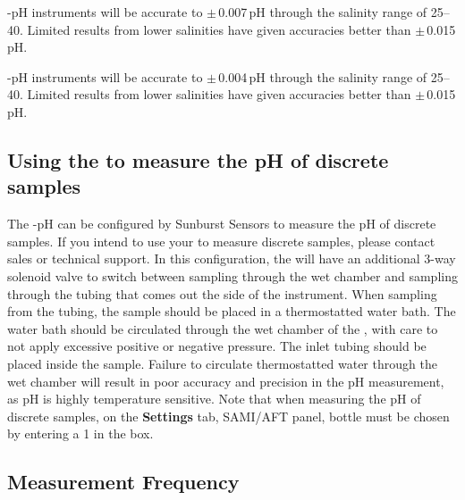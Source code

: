 \ifcase \inst	%

    \instType{}-pH instruments will be accurate to $\pm$\,0.007\,pH through the salinity range of 25--40.  Limited results from lower salinities have given accuracies better than $\pm$\,0.015\,pH.

\else			%

    \instType{}-pH instruments will be accurate to $\pm$\,0.004\,pH through the salinity range of 25--40.  Limited results from lower salinities have given accuracies better than $\pm\,$0.015\,pH.
    
\fi

\ifcase \inst	%

\or			%

\or			%

\subsection{Using the \instType{} to measure the pH of discrete samples}

The \instType{}-pH can be configured by Sunburst Sensors to measure the pH of discrete samples. If you intend to use your \instType{} to measure discrete samples, please contact sales or technical support.  In this configuration, the \instType{} will have an additional 3-way solenoid valve to switch between sampling through the wet chamber and sampling through the tubing that comes out the side of the instrument.  When sampling from the tubing, the sample should be placed in a thermostatted water bath. The water bath should be circulated through the wet chamber of the \instType{}, with care to not apply excessive positive or negative pressure.  The inlet tubing should be placed inside the sample.  Failure to circulate thermostatted water through the wet chamber will result in poor accuracy and precision in the pH measurement, as pH is highly temperature sensitive. Note that when measuring the pH of discrete samples, on the \textbf{Settings} tab,
SAMI/AFT panel, bottle must be chosen by entering a 1 in the box.

\fi


\subsection{Measurement Frequency}

\ifcase \inst	%

